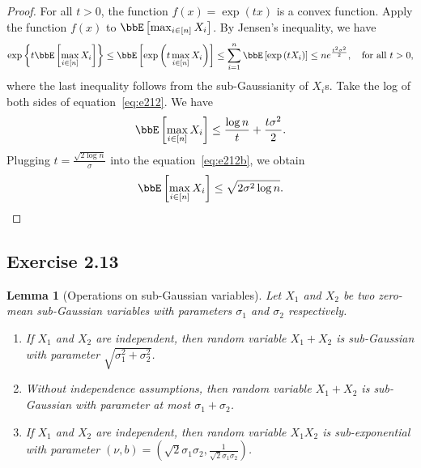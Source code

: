 \documentclass[11pt]{article}
\newcommand{\of}[1]{\left(#1\right)}
\newcommand{\off}[1]{\left[#1\right]}
\newcommand{\offf}[1]{\left\{#1\right\}}
\theoremstyle{plain}
\newtheorem{lem}{Lemma}
\theoremstyle{definition}
\begin{document}
\begin{proof}
	For all $t >0$, the function $f(x) = \exp \of{tx}$ is a convex function. Apply the function $f(x)$ to $\bbE \off{\max_{i \in [n]} X_i} $. By Jensen's inequality, we have
	\begin{equation}\label{eq:e212}
		\exp \offf{t \bbE \off{\max_{i \in [n]} X_i} } \leq \bbE\off{\exp \of{t \max_{i \in [n]} X_i }} \leq \sum_{i= 1}^n \bbE\off{\exp \of{t X_i }} \leq n e^{\frac{t^2 \sigma^2}{2}}, \quad \text{for all }t > 0,
	\end{equation}
	where the last inequality follows from the sub-Gaussianity of $X_i$s. Take the log of both sides of equation~\eqref{eq:e212}. We have
	\begin{equation}\label{eq:e212b}
		\bbE \off{\max_{i \in [n]} X_i}  \leq \frac{\log n}{t} + \frac{t\sigma^2}{2}.
	\end{equation}
	Plugging $t = \frac{\sqrt{2\log n} }{\sigma}$ into the equation~\eqref{eq:e212b}, we obtain
	\[ \bbE \off{\max_{i \in [n]} X_i}  \leq \sqrt{2 \sigma^2 \log n}.\]
\end{proof}


\subsection{Exercise 2.13}
\begin{lem}[Operations on sub-Gaussian variables]
	Let $X_1$ and $X_2$ be two zero-mean sub-Gaussian variables with parameters $\sigma_1$ and $\sigma_2$ respectively. 
	\begin{enumerate}
		\item[(a).] If $X_1$ and $X_2$ are independent, then random variable $X_1 + X_2$ is sub-Gaussian with parameter $\sqrt{\sigma_1^2 + \sigma_2^2}$.
		\item[(b).] Without independence assumptions, then random variable $X_1 + X_2$ is sub-Gaussian with parameter at most 
		$\sigma_1 + \sigma_2$.
		\item[(c).] If $X_1$ and $X_2$ are independent, then random variable $X_1 X_2$ is sub-exponential with parameter $(\nu, b) = \of{\sqrt{2}\sigma_1 \sigma_2, \frac{1}{\sqrt{2}\sigma_1 \sigma_2}}$.
	\end{enumerate}
\end{lem}
\end{document}
